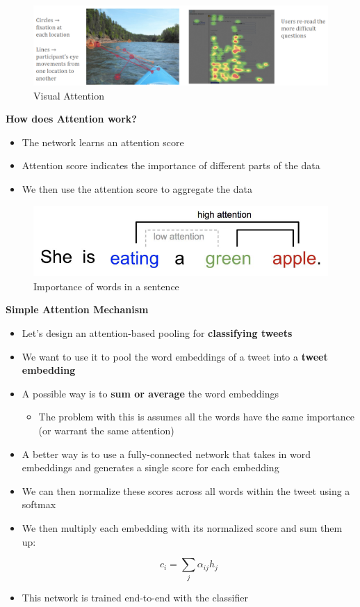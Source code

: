 \begin{figure}[h!t]
    \centering
    \includegraphics[width=0.8\linewidth]{attention.png}
    \caption{Visual Attention}
    \label{fig:enter-label}
\end{figure}

\textbf{How does Attention work?}
\begin{itemize}
    \item The network learns an attention score
    \item Attention score indicates the importance of different parts of the data
    \item We then use the attention score to aggregate the data

\end{itemize}

\begin{figure}[h!t]
    \centering
    \includegraphics[width=0.75\linewidth]{sentenceattention.png}
    \caption{Importance of words in a sentence}
    \label{fig:enter-label}
\end{figure}

\textbf{Simple Attention Mechanism}
\begin{itemize}
    \item Let's design an attention-based pooling for \textbf{classifying tweets}
    \item We want to use it to pool the word embeddings of a tweet into a\textbf{ tweet embedding}
    \item A possible way is to \textbf{sum or average} the word embeddings
    \begin{itemize}
        \item The problem with this is assumes all the words have the same importance (or warrant the same attention)
    \end{itemize}
    \item A better way is to use a fully-connected network that takes in word embeddings and generates a single score for each embedding
    \item We can then normalize these scores across all words within the tweet using a softmax
    \item We then multiply each embedding with its normalized score and sum them up:

\[c_i = \sum_{j} \alpha_{ij} h_j\]

    \item This network is trained end-to-end with the classifier
\end{itemize}

